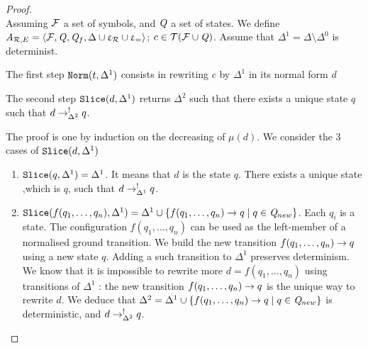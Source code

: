 \begin{proof}\\
  Assuming $\mathcal{F}$ a set of symbols, and $\mathit Q$ a set of states. 
  We define ${\it A}_{\mathcal R,E} = \langle \mathcal{F}, \mathit Q, \mathit Q_f, \Delta \cup \upvarepsilon_{\mathcal R} \cup \upvarepsilon_{=}\rangle$; $c \in \mathcal{ T(F \cup \mathit Q)}$.
  Assume that $\Delta^1 = \Delta \setminus \Delta^0$ is determinist.

  The first step $\mathtt{Norm}(t, \Delta^1)$ consists in rewriting $c$ by
  $\Delta^1$ in its normal form $d$
   
  The second step $\mathtt{Slice}(d, \Delta^1)$ returns $\Delta^2$ such that
  there exists a unique state $q$ such that $d \rightarrow^!_{\Delta^2} q$.

  The proof is one by induction on the decreasing of $\mu(d)$.
  We consider the 3 cases of $\mathtt{Slice}(d, \Delta^1)$
   
  \begin{enumerate}

   \item $\mathtt{Slice}(q, \Delta^1) = \Delta^1$. It means that $d$ is the state $q$. There exists a unique state ,which is $q$, such that $d \rightarrow^!_{\Delta^1} q$.

   \item $\mathtt{Slice}(f(q_1, \dots, q_n), \Delta^1) = \Delta^1 \cup \{ f(q_1, \dots, q_n) \rightarrow q \; | \; q \in \mathit Q_{new}\}$. 
     Each $q_i$ is a state. The configuration $f(q_1, \dots, q_n)$ can be used as the left-member of a normalised
     ground transition. We build the new transition  $f(q_1, \dots, q_n) \rightarrow q$ using a new state $q$. Adding a such
     transition to $\Delta^1$ preserves determinism. We know that it is impossible to rewrite more $d = f(q_1, \dots, q_n)$ 
     using transitions of $\Delta^1$ : the new transition $f(q_1, \dots, q_n) \rightarrow q$ is the unique way to rewrite $d$.
     We deduce that $\Delta^2 = \Delta^1 \cup \{ f(q_1, \dots, q_n) \rightarrow q \; | \; q \in \mathit Q_{new}\}$ is deterministic, and $d \rightarrow^!_{\Delta^2} q$.


\end{enumerate}
\end{proof}
